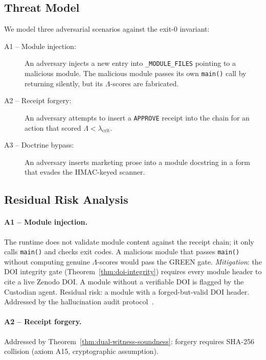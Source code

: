 \subsection{Threat Model}
\label{ssec:threat-model}

We model three adversarial scenarios against the exit-0 invariant:

\begin{description}
  \item[A1 -- Module injection:] An adversary injects a new entry into
    \texttt{\_MODULE\_FILES} pointing to a malicious module.  The malicious
    module passes its own \texttt{main()} call by returning silently, but
    its $\Lambda$-scores are fabricated.
  \item[A2 -- Receipt forgery:] An adversary attempts to insert a
    \texttt{APPROVE} receipt into the chain for an action that scored
    $\Lambda < \lambda_{\mathrm{crit}}$.
  \item[A3 -- Doctrine bypass:] An adversary inserts marketing prose into a
    module docstring in a form that evades the HMAC-keyed scanner.
\end{description}

\subsection{Residual Risk Analysis}
\label{ssec:residual-risk}

\paragraph{A1 -- Module injection.}
The runtime does not validate module content against the receipt chain;
it only calls \texttt{main()} and checks exit codes.  A malicious module
that passes \texttt{main()} without computing genuine $\Lambda$-scores
would pass the GREEN gate.  \emph{Mitigation}: the DOI integrity gate
(Theorem~\ref{thm:doi-integrity}) requires every module header to cite a
live Zenodo DOI.  A module without a verifiable DOI is flagged by the
Custodian agent.  Residual risk: a module with a forged-but-valid DOI header.
Addressed by the hallucination audit protocol~\cite{szl_zoom_out_v18}.

\paragraph{A2 -- Receipt forgery.}
Addressed by Theorem~\ref{thm:dual-witness-soundness}: forgery requires
SHA-256 collision (axiom A15, cryptographic assumption).

